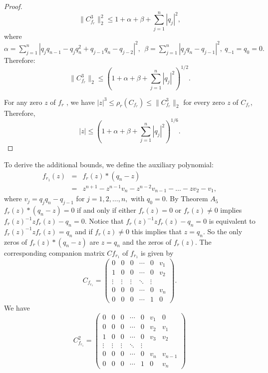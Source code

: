 \documentclass [12pt]{article}
\begin{document}
\begin{proof}
\[
\|C_{f_{r}}^3\|^2_{2} \leq 1 + \alpha+\beta + \sum_{j=1}^{n} |q_j|^2,
\]
 where 
$\alpha=\sum_{j=1}^{n}|q_{j}q_{n-1}-q_{j}q^{2}_{n}+q_{j-1}q_{n}-q_{j-2}|^{2},~~\beta=\sum_{j=1}^{n}|q_{j}q_{n}-q_{j-1}|^{2},~ q_{-1}=q_{0}=0.$
Therefore:
\[
\|C_{f_{r}}^3\|_{2} \leq \left( 1 + \alpha+\beta + \sum_{j=1}^{n} |q_j|^2\right)^{1/2}.
\]

\noindent For any zero $z$ of $f_{r}$ , we have $|z|^{3}\le \rho_{r}(C_{f_{r}}) \leq \|C_{f_{r}}^3\|_{2}$ for every zero  $z$ of $C_{f_{r}}$, Therefore,
\[
|z| \leq \left(1 + \alpha+\beta + \sum_{j=1}^{n} |q_j|^2 \right)^{1/6}.\]
\end{proof}






  

\noindent To derive the additional bounds, we define the auxiliary polynomial:
\begin{eqnarray*}
    f_{r_{1}}(z)&=& f_{r}(z)*(q_{n} -z)\\&=& z^{n+1}-z^{n-1}v_{n}-z^{n-2}v_{n-1}-\dots- zv_{2}-v_{1},
\end{eqnarray*}
where $v_{j}=q_{j}q_{n}-q_{j-1}$ for $j=1,2,\dots,n,$ with $q_{0}=0$.
   By Theorem $A_{5}$ $f_{r}(z)*(q_{n} -z)=0$ if and only if either $f_{r}(z)=0$ or  $f_{r}(z)\neq 0$ implies $f_{r}(z)^{-1}zf_{r}(z)- q_{n}=0$. Notice
   that  $f_{r}(z)^{-1}zf_{r}(z)- q_{n}=0$ is equivalent to  $f_{r}(z)^{-1}zf_{r}(z)=q_{n}$ and if $f_{r}(z)\neq 0$ this implies that $z=q_{n}$. So the only zeros of $f_{r}(z)*(q_{n} -z)$ are $z=q_{n}$ and the zeros of $f_{r}(z)$.
   The corresponding companion matrix $Cf_{r_{1}}$ of $f_{r_{1}}$ is given by
   \[
C_{f_{r_{1}}} = 
\begin{pmatrix}
0 & 0 & 0 & \cdots &0& v_{1} \\
1 & 0 & 0 & \cdots &0& v_{2} \\
\vdots & \vdots & \vdots & \ddots & \vdots \\
0 & 0 & 0 & \cdots &0 & v_{n} \\
0 & 0 & 0 & \cdots &1& 0
\end{pmatrix}.
\] 
We have
  \[
C^{2}_{f_{r_{1}}} = 
\begin{pmatrix}
0 & 0 & 0 & \cdots &0& v_{1}&0 \\
0 & 0 & 0 & \cdots &0& v_{2} &v_{1}\\
1 & 0 & 0 & \cdots &0& v_{3} &v_{2}\\
\vdots & \vdots & \vdots & \ddots & \vdots \\
0 & 0 & 0 & \cdots &0 & v_{n} &v_{n-1}\\
0 & 0 & 0 & \cdots &1 & 0 & v_{n}
\end{pmatrix}
\] 
\end{document}
